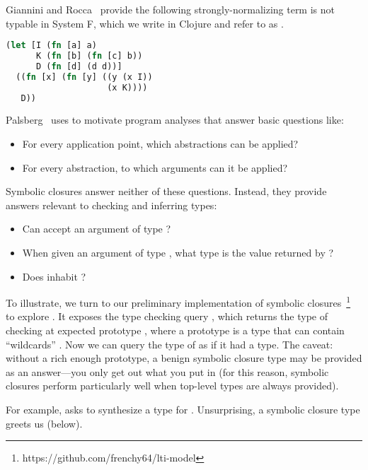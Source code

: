 
Giannini and Rocca~\cite{giannini1988characterization}
provide the following strongly-normalizing term is not typable in System F,
which we write in Clojure and refer to as \GRterm.

\begin{lstlisting}[language=Clojure]
(let [I (fn [a] a)
      K (fn [b] (fn [c] b))
      D (fn [d] (d d))]
  ((fn [x] (fn [y] ((y (x I))
                    (x K))))
   D))
\end{lstlisting}

Palsberg~\cite{Palsberg:1995:CAC:200994.201001}
uses \GRterm to motivate program analyses
that answer basic questions like:
\begin{itemize}
  \item For every application point, which abstractions can be applied?
  \item For every abstraction, to which arguments can it be applied?
\end{itemize}
Symbolic closures answer neither of these questions.
Instead, they provide answers relevant to checking and inferring types:
\begin{itemize}
  \item Can \GRterm accept an argument of type \ltiT{}?
  \item When given an argument of type \ltiT{}, what type is the value returned by \GRterm?
  \item Does \GRterm inhabit \ltiFn{\ltiT{}}{\ltiS{}}?
\end{itemize}

To illustrate, we turn to
our preliminary implementation of symbolic closures~\footnote{https://github.com/frenchy64/lti-model}
to explore \GRterm.
It exposes the type checking query ,
which returns the type of checking  at expected prototype ,
where a prototype is a type that can contain ``wildcards'' .
Now we can query the type of \GRterm as if it had a type.
The caveat: without a rich enough prototype,
a benign symbolic closure type may be provided as an answer---you only get out what you put in
(for this reason, symbolic closures perform particularly well when top-level types are always provided).

For example,  asks to synthesize a type for \GRterm.
Unsurprising, a symbolic closure type greets us (below).


